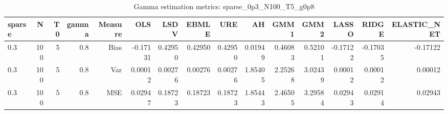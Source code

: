 \begin{table}[!htbp]\centering
\caption{Gamma estimation metrics: sparse_0p3_N100_T5_g0p8}
\label{tab:table1_sparse_0p3_N100_T5_g0p8}
\begin{tabular}{lrrrrrrrrrrrrrr}
\hline
sparse & N & T0 & gamma & Measure & OLS & LSDV & EBMLE & URE & AH & GMM1 & GMM2 & LASSO & RIDGE & ELASTIC_NET \\
\hline
0.3 & 100 & 5 & 0.8 & Bias & -0.17131 & 0.42950 & 0.42950 & 0.42950 & 0.01949 & 0.46083 & 0.52101 & -0.17122 & -0.17035 & -0.17122 \\
0.3 & 100 & 5 & 0.8 & Var & 0.00012 & 0.00276 & 0.00276 & 0.00276 & 1.85405 & 2.25268 & 3.02439 & 0.00012 & 0.00012 & 0.00012 \\
0.3 & 100 & 5 & 0.8 & MSE & 0.02947 & 0.18723 & 0.18723 & 0.18723 & 1.85443 & 2.46505 & 3.29584 & 0.02943 & 0.02914 & 0.02943 \\
\hline
\end{tabular}
\end{table}

